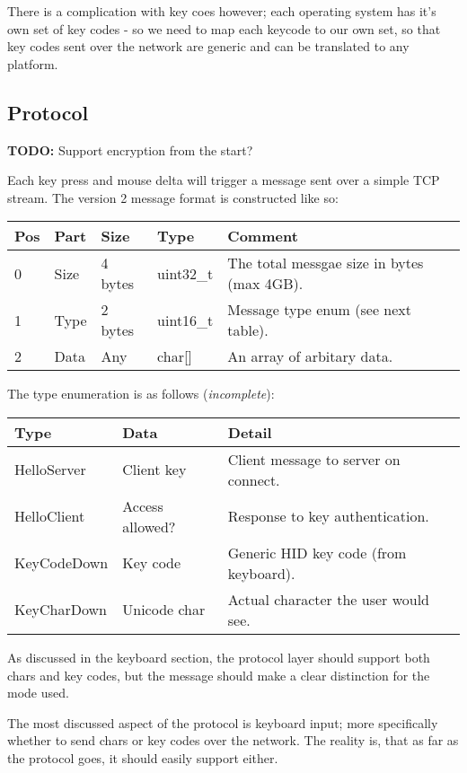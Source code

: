 There is a complication with key coes however; each operating system has it's
own set of key codes - so we need to map each keycode to our own set, so that
key codes sent over the network are generic and can be translated to any 
platform.

\subsection{Protocol}

\textbf{TODO:} Support encryption from the start?

Each key press and mouse delta will trigger a message sent over a simple TCP 
stream. The version 2 message format is constructed like so:

\begin{tabular}{|l|l|l|l|l|}
\hline
\textbf{Pos} &
\textbf{Part} &
\textbf{Size} &
\textbf{Type} &
\textbf{Comment} \\
\hline
0 & Size & 4 bytes & uint32\_t & The total messgae size in bytes (max 4GB). \\
1 & Type & 2 bytes & uint16\_t & Message type enum (see next table). \\
2 & Data & Any & char[] & An array of arbitary data. \\
\hline
\end{tabular}

The type enumeration is as follows (\textit{incomplete}):

\begin{tabular}{|l|l|l|}
\hline
\textbf{Type} &
\textbf{Data} &
\textbf{Detail} \\
\hline
HelloServer & Client key & Client message to server on connect. \\
HelloClient & Access allowed? & Response to key authentication. \\
KeyCodeDown & Key code & Generic HID key code (from keyboard). \\
KeyCharDown & Unicode char & Actual character the user would see. \\
\hline
\end{tabular}

As discussed in the keyboard section, the protocol layer should support both
chars and key codes, but the message should make a clear distinction for the
mode used.

The most discussed aspect of the protocol is keyboard input; more specifically
whether to send chars or key codes over the network. The reality is, that as far
as the protocol goes, it should easily support either.
